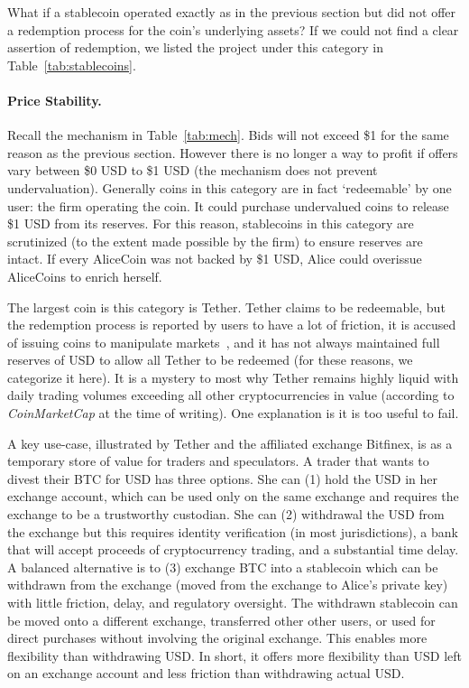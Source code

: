 What if a stablecoin operated exactly as in the previous section but did not offer a redemption process for the coin's underlying assets? If we could not find a clear assertion of redemption, we listed the project under this category in Table~\ref{tab:stablecoins}.

\paragraph{Price Stability.} Recall the mechanism in Table~\ref{tab:mech}. Bids will not exceed \$1 for the same reason as the previous section. However there is no longer a way to profit if offers vary between \$0 USD to \$1 USD (\ie the mechanism does not prevent undervaluation). Generally coins in this category are in fact `redeemable' by one user: the firm operating the coin. It could purchase undervalued coins to release \$1 USD from its reserves. For this reason, stablecoins in this category are scrutinized (to the extent made possible by the firm) to ensure reserves are intact. If every AliceCoin was not backed by \$1 USD, Alice could overissue AliceCoins to enrich herself.

The largest coin is this category is Tether. Tether claims to be redeemable, but the redemption process is reported by users to have a lot of friction, it is accused of issuing coins to manipulate markets~\cite{griffin2018bitcoin}, and it has not always maintained full reserves of USD to allow all Tether to be redeemed (for these reasons, we categorize it here). It is a mystery to most why Tether remains highly liquid with daily trading volumes exceeding all other cryptocurrencies in value (according to \textit{CoinMarketCap} at the time of writing). One explanation is it is too useful to fail.

A key use-case, illustrated by Tether and the affiliated exchange Bitfinex, is as a temporary store of value for traders and speculators. A trader that wants to divest their BTC for USD has three options. She can (1) hold the USD in her exchange account, which can be used only on the same exchange and requires the exchange to be a trustworthy custodian. She can (2) withdrawal the USD from the exchange but this requires identity verification (in most jurisdictions), a bank that will accept proceeds of cryptocurrency trading, and a substantial time delay. A balanced alternative is to (3) exchange BTC into a stablecoin which can be withdrawn from the exchange (\ie moved from the exchange to Alice's private key) with little friction, delay, and regulatory oversight. The withdrawn stablecoin can be moved onto a different exchange, transferred other other users, or used for direct purchases without involving the original exchange. This enables more flexibility than withdrawing USD. In short, it offers more flexibility than USD left on an exchange account and less friction than withdrawing actual USD.
 
